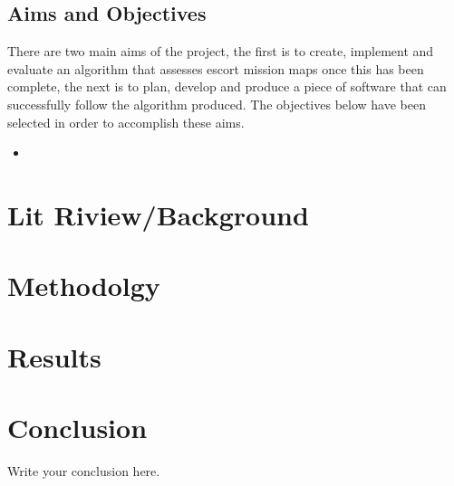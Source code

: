 \documentclass{article}
\begin{document}
\subsection{Aims and Objectives}
There are two main aims of the project, the first is to create, implement and evaluate an algorithm that assesses escort mission maps once this has been complete, the next is to plan, develop and produce a piece of software that can successfully follow the algorithm produced. The objectives below have been selected in order to accomplish these aims.
 \begin{itemize}
	\item 
\end{itemize}

\section{Lit Riview/Background}

\section{Methodolgy}

\section{Results}

\section{Conclusion}
Write your conclusion here.
\end{document}
